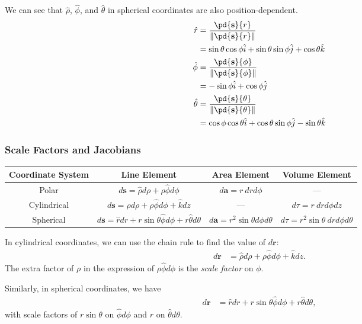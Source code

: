 \documentclass[10pt]{mypackage}
\begin{document}
We can see that $\hat\rho$, $\hat\phi$, and $\hat\theta$ in spherical coordinates are also position-dependent.
\begin{align*}
  \hat r &= \frac{\pd{\mathbf{s}}{r}}{\norm{\pd{\mathbf{s}}{r}}}\\
         &= \sin\theta\cos\phi\hat{i} + \sin\theta\sin\phi\hat{j} + \cos\theta\hat{k}\\
  \hat{\phi} &= \frac{\pd{\mathbf{s}}{\phi}}{\norm{\pd{\mathbf{s}}{\phi}}}\\
             &= -\sin\phi\hat{i} + \cos\phi\hat{j}\\
  \hat{\theta} &= \frac{\pd{\mathbf{s}}{\theta}}{\norm{\pd{\mathbf{s}}{\theta}}}\\
               &= \cos\phi\cos\theta\hat{i} + \cos\theta\sin\phi\hat{j} - \sin\theta\hat{k}
\end{align*}
\subsubsection{Scale Factors and Jacobians}%
\begin{center}
  \renewcommand{\arraystretch}{1.5}
  \begin{tabular}{c|c|c|c}
    Coordinate System & Line Element & Area Element & Volume Element\\
    \hline\hline
    Polar & $d \mathbf{s} = \hat\rho d\rho + \rho \hat\phi d\phi$ & $d\mathbf{a} = r\:drd\phi$ & ---\\
    Cylindrical & $d \mathbf{s} = \hat\rho d\rho + \rho\hat\phi d\phi + \hat k dz$ & --- & $d\tau = r\:dr d\phi dz$\\
    Spherical & $d \mathbf{s} = \hat r dr + r\sin\theta \hat\phi d\phi + r\hat\theta d\theta$ &  $d \mathbf{a} = r^2\sin\theta d\phi d\theta$ & $d\tau = r^2\sin\theta\:dr d\phi d\theta$
  \end{tabular}
\end{center}
In cylindrical coordinates, we can use the chain rule to find the value of $d \mathbf{r}$:
\begin{align*}
  d \mathbf{r} &= \hat{\rho}d\rho + \rho\hat\phi d\phi + \hat k dz.
\end{align*}
The extra factor of $\rho$ in the expression of $\rho\hat\phi d\phi$ is the \textit{scale factor} on $\phi$.\newline

Similarly, in spherical coordinates, we have
\begin{align*}
  d \mathbf{r} &= \hat{r} dr +  r\sin\theta \hat{\phi}d\phi + r\hat{\theta}d\theta,
\end{align*}
with scale factors of $r\sin\theta$ on $\hat\phi d\phi$ and $r$ on $\hat\theta d\theta$.\newline
\end{document}
